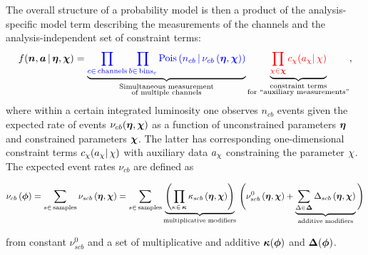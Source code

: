 The overall structure of a \HiFa{} probability model is then a product of the {\color{blue}analysis-specific model term} describing the measurements of the channels and the {\color{red}analysis-independent set of constraint terms}:
\begin{equation}
 \label{eqn:hifa_template}
 f(\channelcounts, \auxdata \,|\,\freeset,\constrset) = \underbrace{\color{blue}{\prod_{c\in\mathrm{\,channels}} \prod_{b \in \mathrm{\,bins}_c}\textrm{Pois}\left(n_{cb} \,\middle|\, \nu_{cb}\left(\freeset,\constrset\right)\right)}}_{\substack{\text{Simultaneous measurement}\\%
   \text{of multiple channels}}} \underbrace{\color{red}{\prod_{\singleconstr \in \constrset} c_{\singleconstr}(a_{\singleconstr} |\, \singleconstr)}}_{\substack{\text{constraint terms}\\%
   \text{for ``auxiliary measurements''}}},
\end{equation}
where within a certain integrated luminosity one observes $n_{cb}$ events given the expected rate of events $\nu_{cb}(\bm{\eta},\bm{\chi})$ as a function of unconstrained parameters $\bm{\eta}$ and constrained parameters $\bm{\chi}$.
The latter has corresponding one-dimensional constraint terms $c_\chi(a_\chi|\,\chi)$ with auxiliary data $a_\chi$ constraining the parameter $\chi$.
The expected event rates $\nu_{cb}$ are defined as

\begin{equation}
 \label{eqn:sample_rates}
 \nu_{cb}\left(\bm{\phi}\right) = \sum_{s\in\mathrm{\,samples}} \nu_{scb}\left(\bm{\eta},\bm{\chi}\right) = \sum_{s\in\mathrm{\,samples}}\underbrace{\left(\prod_{\kappa\in\,\bm{\kappa}} \kappa_{scb}\left(\bm{\eta},\bm{\chi}\right)\right)}_{\text{multiplicative modifiers}}\, \Bigg(\nu_{scb}^0\left(\bm{\eta}, \bm{\chi}\right) + \underbrace{\sum_{\Delta\in\bm{\Delta}} \Delta_{scb}\left(\bm{\eta},\bm{\chi}\right)}_{\text{additive modifiers}}\Bigg)
\end{equation}

\noindent from constant  $\nu_{scb}^0$ and a set of multiplicative and additive  $\bm{\kappa}(\bm{\phi})$ and $\bm{\Delta}(\bm{\phi})$.
